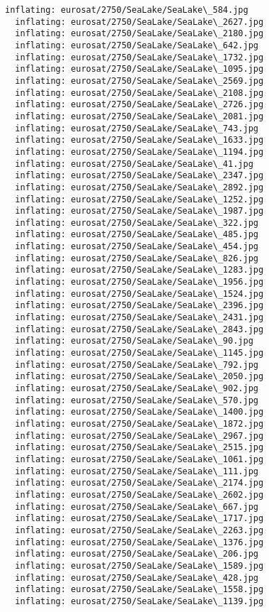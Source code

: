 \documentclass[11pt]{article}
\begin{document}
\begin{Verbatim}[commandchars=\\\{\}]
  inflating: eurosat/2750/SeaLake/SeaLake\_584.jpg
  inflating: eurosat/2750/SeaLake/SeaLake\_2627.jpg
  inflating: eurosat/2750/SeaLake/SeaLake\_2180.jpg
  inflating: eurosat/2750/SeaLake/SeaLake\_642.jpg
  inflating: eurosat/2750/SeaLake/SeaLake\_1732.jpg
  inflating: eurosat/2750/SeaLake/SeaLake\_1095.jpg
  inflating: eurosat/2750/SeaLake/SeaLake\_2569.jpg
  inflating: eurosat/2750/SeaLake/SeaLake\_2108.jpg
  inflating: eurosat/2750/SeaLake/SeaLake\_2726.jpg
  inflating: eurosat/2750/SeaLake/SeaLake\_2081.jpg
  inflating: eurosat/2750/SeaLake/SeaLake\_743.jpg
  inflating: eurosat/2750/SeaLake/SeaLake\_1633.jpg
  inflating: eurosat/2750/SeaLake/SeaLake\_1194.jpg
  inflating: eurosat/2750/SeaLake/SeaLake\_41.jpg
  inflating: eurosat/2750/SeaLake/SeaLake\_2347.jpg
  inflating: eurosat/2750/SeaLake/SeaLake\_2892.jpg
  inflating: eurosat/2750/SeaLake/SeaLake\_1252.jpg
  inflating: eurosat/2750/SeaLake/SeaLake\_1987.jpg
  inflating: eurosat/2750/SeaLake/SeaLake\_322.jpg
  inflating: eurosat/2750/SeaLake/SeaLake\_485.jpg
  inflating: eurosat/2750/SeaLake/SeaLake\_454.jpg
  inflating: eurosat/2750/SeaLake/SeaLake\_826.jpg
  inflating: eurosat/2750/SeaLake/SeaLake\_1283.jpg
  inflating: eurosat/2750/SeaLake/SeaLake\_1956.jpg
  inflating: eurosat/2750/SeaLake/SeaLake\_1524.jpg
  inflating: eurosat/2750/SeaLake/SeaLake\_2396.jpg
  inflating: eurosat/2750/SeaLake/SeaLake\_2431.jpg
  inflating: eurosat/2750/SeaLake/SeaLake\_2843.jpg
  inflating: eurosat/2750/SeaLake/SeaLake\_90.jpg
  inflating: eurosat/2750/SeaLake/SeaLake\_1145.jpg
  inflating: eurosat/2750/SeaLake/SeaLake\_792.jpg
  inflating: eurosat/2750/SeaLake/SeaLake\_2050.jpg
  inflating: eurosat/2750/SeaLake/SeaLake\_902.jpg
  inflating: eurosat/2750/SeaLake/SeaLake\_570.jpg
  inflating: eurosat/2750/SeaLake/SeaLake\_1400.jpg
  inflating: eurosat/2750/SeaLake/SeaLake\_1872.jpg
  inflating: eurosat/2750/SeaLake/SeaLake\_2967.jpg
  inflating: eurosat/2750/SeaLake/SeaLake\_2515.jpg
  inflating: eurosat/2750/SeaLake/SeaLake\_1061.jpg
  inflating: eurosat/2750/SeaLake/SeaLake\_111.jpg
  inflating: eurosat/2750/SeaLake/SeaLake\_2174.jpg
  inflating: eurosat/2750/SeaLake/SeaLake\_2602.jpg
  inflating: eurosat/2750/SeaLake/SeaLake\_667.jpg
  inflating: eurosat/2750/SeaLake/SeaLake\_1717.jpg
  inflating: eurosat/2750/SeaLake/SeaLake\_2263.jpg
  inflating: eurosat/2750/SeaLake/SeaLake\_1376.jpg
  inflating: eurosat/2750/SeaLake/SeaLake\_206.jpg
  inflating: eurosat/2750/SeaLake/SeaLake\_1589.jpg
  inflating: eurosat/2750/SeaLake/SeaLake\_428.jpg
  inflating: eurosat/2750/SeaLake/SeaLake\_1558.jpg
  inflating: eurosat/2750/SeaLake/SeaLake\_1139.jpg

\end{Verbatim}
\end{document}
